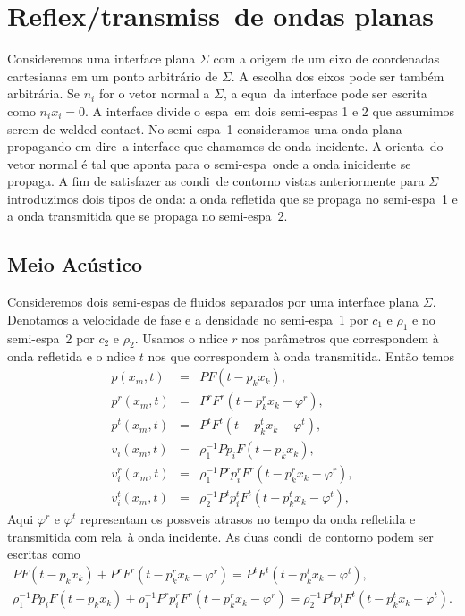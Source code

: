 \section{Reflex\ao/transmiss\ao\ de ondas planas}

Consideremos uma interface plana $\Sigma$ com a origem de um eixo de
coordenadas cartesianas em um ponto arbitr\'ario de $\Sigma$. A escolha
dos eixos pode ser tamb\'em arbitr\'aria. Se $n_i$ for o vetor normal a
$\Sigma$, a equa\cao\ da interface pode ser escrita como $n_i x_i = 0$.
A interface divide o espa\co\ em dois semi-espa\co s 1 e 2 que assumimos
serem de welded contact. No semi-espa\co\ 1 consideramos uma onda plana
propagando em dire\cao\ a interface que chamamos de onda incidente. A
orienta\cao\ do vetor normal \'e tal que aponta para o semi-espa\co\
onde a onda inicidente se propaga. A fim de satisfazer as condi\coes\ de
contorno vistas anteriormente para $\Sigma$ introduzimos dois tipos de
onda: a onda refletida que se propaga no semi-espa\co\ 1 e a onda
transmitida que se propaga no semi-espa\co\ 2.

\subsection{Meio Ac\'ustico}

Consideremos dois semi-espa\co s de fluidos separados por uma interface
plana $\Sigma$. Denotamos a velocidade de fase e a densidade no
semi-espa\co\ 1 por $c_1$ e $\rho_1$ e no semi-espa\co\ 2 por $c_2$ e
$\rho_2$. Usamos o \ih ndice $r$ nos par\^ametros que correspondem \`a
onda refletida e o \ih ndice $t$ nos que correspondem \`a onda
transmitida. Ent\~ao temos
\begin{eqnarray}
p(x_m,t) &=& PF(t - p_k x_k),\\
p^r(x_m,t) &=& P^r F^r(t - p_k^r x_k - \varphi^r),\\
p^t(x_m,t) &=& P^t F^t(t - p_k^t x_k - \varphi^t),\\
v_i(x_m,t) &=& \rho_1^{-1}Pp_i F(t - p_k x_k),\\
v_i^r(x_m,t) &=& \rho_1^{-1}P^r p_i^r F^r(t - p_k^r x_k - \varphi^r),\\
v_i^t(x_m,t) &=& \rho_2^{-1}P^t p_i^t F^t(t - p_k^t x_k - \varphi^t),
\end{eqnarray}
Aqui $\varphi^r$ e $\varphi^t$ representam os poss\ih veis atrasos no
tempo da onda refletida e transmitida com rela\cao\ \`a onda incidente.
As duas condi\coes\ de contorno podem ser escritas como
\begin{eqnarray}
PF(t - p_k x_k) + P^r F^r(t - p_k^r x_k - \varphi^r) = P^t F^t(t - p_k^t x_k - \varphi^t),\\
\rho_1^{-1}Pp_i F(t - p_k x_k) + \rho_1^{-1}P^r p_i^r F^r(t - p_k^r x_k - \varphi^r) = \rho_2^{-1}P^t p_i^t F^t(t - p_k^t x_k - \varphi^t).
\end{eqnarray}

